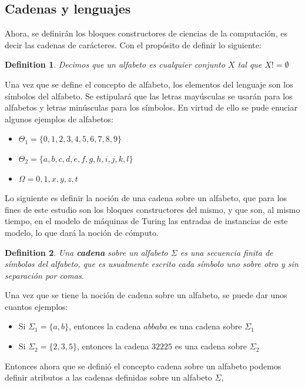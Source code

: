 \documentclass[10pt]{report}
\newtheorem{definition}{Definition}
\begin{document}
    \subsection{Cadenas y lenguajes}\label{sec:Cadenas-y-lenguajes}
    Ahora, se definirán los bloques constructores de ciencias de la computación, es decir las cadenas de carácteres.
    Con el propósito de definir lo siguiente:\space
    \begin{definition}
            Decimos que un alfabeto es cualquier conjunto $X$ tal que $X != \emptyset$
    \end{definition}
    \newline
    Una vez que se define el concepto de alfabeto, los elementos del lenguaje son los símbolos del alfabeto.
    Se estipulará que las letras mayúsculas se usarán para los alfabetos y letras minúsculas para los símbolos.
    En virtud de ello se pude enuciar algunos ejemplos de alfabetos:
    \begin{itemize}
        \item $\Theta_{1} = \{0,1,2,3,4,5,6,7,8,9 \}$
        \item $\Theta_{2} = \{a,b,c,d,e,f,g,h,i,j,k,l \}$
        \item $\Omega = { 0,1,x,y,z,t}$
    \end{itemize}\space
    Lo siguiente es definir la noción de una cadena sobre un alfabeto, que para los fines de este estudio
    son los bloques constructores del mismo, y que son, al mismo tiempo, en el modelo de
    máquinas de Turing las entradas de instancias de este modelo, lo que dará la noción de cómputo.
    \begin{definition}
        Una \textbf{cadena} sobre un alfabeto $\Sigma$ es una secuencia finita de símbolos del alfabeto,
       que es usualmente escrito cada símbolo uno sobre otro y sin separación por comas.
    \end{definition}
    Una vez que se tiene la noción de cadena sobre un alfabeto, se puede dar unos cuantos ejemplos:
    \begin{itemize}
        \item Si $\Sigma_{1} = \{a,b\}$, entonces la cadena $abbaba$ es una cadena sobre $\Sigma_{1}$
        \item Si $\Sigma_{2} = \{ 2,3,5 \}$, entonces la cadena $32225$ es una cadena sobre $\Sigma_{2}$
    \end{itemize}
    Entonces ahora que se definió el concepto cadena sobre un alfabeto podemos definir atributos a las cadenas definidas sobre un
    alfabeto $\Sigma$,\newline
\end{document}
